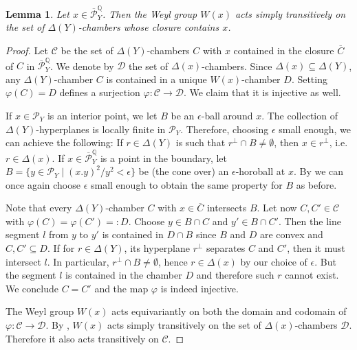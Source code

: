 \documentclass{amsart}
\theoremstyle{definition}
\theoremstyle{plain}
\newtheorem{lemma}[definition]{Lemma}
\newcommand{\C}{\mathcal{C}}
\newcommand{\D}{\mathcal{D}}
\renewcommand{\P}{\mathcal{P}}
\newcommand{\Pbar}{\overline{\P}^\mathbb{Q}}
\begin{document}
\begin{lemma}\label{lem:transitive}
Let $x \in \Pbar_Y$. Then the Weyl group $W(x)$ acts simply transitively on the set of $\Delta(Y)$-chambers whose closure contains $x$.
\end{lemma}
\begin{proof}
 Let $\mathcal{C}$ be the set of $\Delta(Y)$-chambers $C$ with $x$ contained in the closure $\overline{ C}$ of $C$ in $
 \Pbar_Y$.
 We denote by $\mathcal{D}$ the set of $\Delta(x)$-chambers.
 Since $\Delta(x) \subseteq \Delta(Y)$, any $\Delta(Y)$-chamber $C$ is contained in a unique $W(x)$-chamber $D$. Setting $\varphi(C)=D$ defines a surjection $\varphi\colon \mathcal{C} \to \mathcal{D}$. We claim that it is injective as well.

If $x \in \P_Y$ is an interior point, we let $B$ be an $\epsilon$-ball around $x$.
The collection of $\Delta(Y)$-hyperplanes is locally finite in $\P_Y$.
Therefore, choosing $\epsilon$ small enough, we can achieve the following:
If $r \in \Delta(Y)$ is such that $r^\perp \cap B\neq \emptyset$, then $x \in r^\perp$, i.e. $r \in \Delta(x)$.
If $x\in \Pbar_Y$ is a point in the boundary, let $B=\{y \in \P_Y \mid (x.y)^2/y^2 < \epsilon\}$ be (the cone over) an $\epsilon$-horoball at $x$.
By \cite[Corollary 3.12]{shimada:k3_auto} we can once again choose $\epsilon$ small enough to obtain the same property for $B$ as before.

Note that every $\Delta(Y)$-chamber $C$ with $x \in \overline{C}$ intersects $B$.
Let now $C, C' \in \mathcal{C}$ with $\varphi(C) = \varphi(C')=:D$. Choose $y \in B\cap C$ and $y' \in B \cap C'$. Then the line segment $l$ from $y$ to $y'$ is contained in $D\cap B$ since $B$ and $D$ are convex and $C,C' \subseteq D$.
If for $r \in \Delta(Y)$, its hyperplane $r^\perp$ separates $C$ and $C'$, then it must intersect $l$. In particular, $r^\perp \cap B \neq \emptyset$, hence $r \in \Delta(x)$ by our choice of $\epsilon$.
But the segment $l$ is contained in the chamber $D$ and therefore such $r$ cannot exist. We conclude $C=C'$ and the map $\varphi$ is indeed injective.

The Weyl group $W(x)$ acts equivariantly on both the domain and codomain of $\varphi \colon \C \to \D$. By , $W(x)$ acts simply transitively on the set of $\Delta(x)$-chambers $\D$.
Therefore it also acts transitively on $\C$.
\end{proof}
\end{document}
